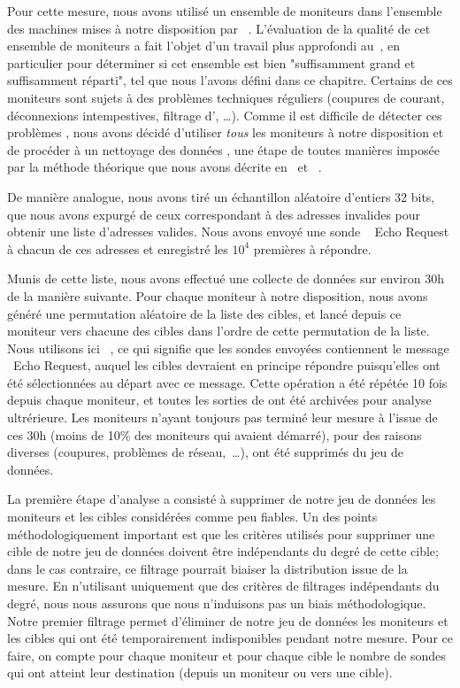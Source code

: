 Pour cette mesure, nous avons utilisé un ensemble de moniteurs dans l'ensemble
des machines mises à notre disposition par \planetlab~\cite{planetlab}.
L'évaluation de la qualité de cet ensemble de moniteurs a fait l'objet d'un
travail plus approfondi au~, en particulier pour déterminer si
cet ensemble est bien "suffisamment grand et suffisamment réparti", tel que nous
l'avons défini dans ce chapitre. Certains de ces moniteurs sont sujets à des
problèmes techniques réguliers (coupures de courant, déconnexions intempestives,
filtrage d'\icmp, \ldots). Comme il est difficile de détecter ces problèmes
\apriori, nous avons décidé d'utiliser {\em tous} les moniteurs à notre
disposition et de procéder à un nettoyage des données \aposteriori, une étape de
toutes manières imposée par la méthode théorique que nous avons décrite
en~ et ~.

De manière analogue, nous avons tiré un échantillon aléatoire d'entiers 32 bits,
que nous avons expurgé de ceux correspondant à des adresses \ip invalides pour
obtenir une liste d'adresses \ip valides. Nous avons envoyé une sonde \icmp~{\sc
Echo Request} à chacun de ces adresses et enregistré les $10^4$ premières à
répondre.

Munis de cette liste, nous avons effectué une collecte de données sur environ
30h de la manière suivante. Pour chaque moniteur à notre disposition, nous avons
généré une permutation aléatoire de la liste des cibles, et lancé \traceroute
depuis ce moniteur vers chacune des cibles dans l'ordre de cette permutation
de la liste. Nous utilisons ici \traceroute~\icmp, ce qui signifie que les
sondes envoyées contiennent le message \icmp~{\sc Echo Request}, auquel les
cibles devraient en principe répondre puisqu'elles ont été sélectionnées au
départ avec ce message. Cette opération a été répétée 10 fois depuis chaque
moniteur, et toutes les sorties de \traceroute ont été archivées pour analyse
ultrérieure. Les moniteurs n'ayant toujours pas terminé leur mesure à l'issue de
ces 30h (moins de 10\% des moniteurs qui avaient démarré), pour des raisons
diverses (coupures, problèmes de réseau,~\ldots), ont été supprimés du jeu de
données.

La première étape d'analyse a consisté à supprimer de notre jeu de données les
moniteurs et les cibles considérées comme peu fiables. Un des points
méthodologiquement important est que les critères utilisés pour supprimer une
cible de notre jeu de données doivent être indépendants \apriori du degré de
cette cible; dans le cas contraire, ce filtrage pourrait biaiser la distribution issue
de la mesure. En n'utilisant uniquement que des critères de filtrages \apriori
indépendants du degré, nous nous assurons que nous n'induisons pas un biais
méthodologique. Notre premier filtrage permet d'éliminer de notre jeu de données
les moniteurs et les cibles qui ont été temporairement indisponibles pendant
notre mesure. Pour ce faire, on compte pour chaque moniteur et pour chaque cible
le nombre de sondes \traceroute qui ont atteint leur destination (depuis un
moniteur ou vers une cible).

